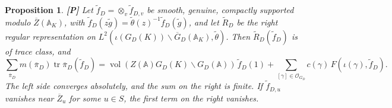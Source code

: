 \documentclass[12pt]{article}
\newcommand{\ov}[1]{\overline{#1}}
\newcommand{\A}{\mathbb{A}}
\newcommand{\tr}{\operatorname{tr}}
\newcommand{\vol}{\operatorname{vol}}
\newcommand{\Zb}{\ov{Z}}
\newcommand{\GDb}{\ov{G}_D}
\newcommand{\pib}{\ov{\pi}}
\newcommand{\Pv}{\textbf{[P]}}
\theoremstyle{plain}
\newtheorem{proposition}[theorem]{Proposition}
\theoremstyle{definition}
\begin{document}
\begin{proposition}\label{prop:geomD}\Pv
Let $\tilde f_D=\otimes_v\tilde f_{D,v}$ be smooth, genuine, compactly supported modulo $\Zb(\A_K)$, with $\tilde f_D(z\tilde g)=\tilde\theta(z)^{-1}\tilde f_D(\tilde g)$, and let $\tilde R_D$ be the right regular representation on $L^2(\iota(G_D(K))\backslash\GDb(\A_K),\tilde\theta)$. Then $\tilde R_D(\tilde f_D)$ is of trace class, and
\[ \sum_{\pib_D}m(\pib_D)\tr\pib_D(\tilde f_D)=\vol(Z(\A)G_D(K)\backslash G_D(\A))\,\tilde f_D(1)+\sum_{[\gamma]\in\mathcal O_{G_D}}c(\gamma)\,F(\iota(\gamma),\tilde f_D). \]
The left side converges absolutely, and the sum on the right is finite. If $\tilde f_{D,u}$ vanishes near $\Zb_u$ for some $u\in S$, the first term on the right vanishes.
\end{proposition}
\end{document}
